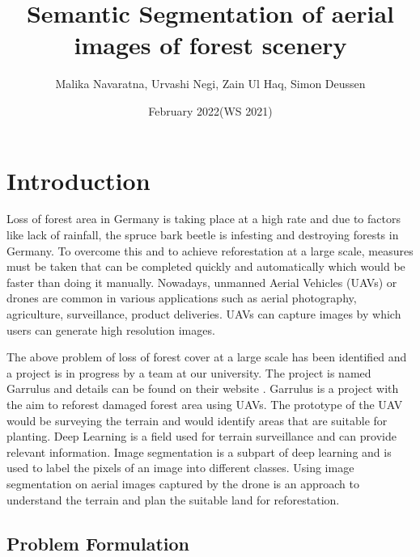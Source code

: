 \documentclass[rnd]{mas_proposal}
\title{Semantic Segmentation of aerial images of forest scenery}
\author{Malika Navaratna, Urvashi Negi, Zain Ul Haq, Simon Deussen}
\date{February 2022(WS 2021)}
\begin{document}
\maketitle

\pagestyle{plain}
\tableofcontents
\clearpage
\section{Introduction}
Loss of forest area in Germany is taking place at a high rate and due to factors like lack of rainfall, the spruce bark beetle is infesting and destroying forests in Germany. 
To overcome this and to achieve reforestation at a large scale, measures must be taken that can be completed quickly and automatically which would be faster than doing it manually. 
Nowadays, unmanned Aerial Vehicles (UAVs) or drones are common in various applications such as aerial photography, agriculture, surveillance, product deliveries. UAVs can capture images
by which users can generate high resolution images.  

The above problem of loss of forest cover at a large scale has been identified and a project is in progress by a team at our university. The project is named Garrulus and 
details can be found on their website \cite{hbrs-garrulus}. Garrulus is a project with the aim to reforest damaged forest area using UAVs. The prototype of the UAV would be surveying the 
terrain and would identify areas that are suitable for planting. 
Deep Learning is a field used for terrain surveillance and can provide relevant information. Image segmentation is a subpart of deep learning and is used to label the pixels 
of an image into different classes. Using image segmentation on aerial images captured by the drone is an approach to understand the terrain and plan the suitable land for reforestation.


\subsection{Problem Formulation}
\end{document}
